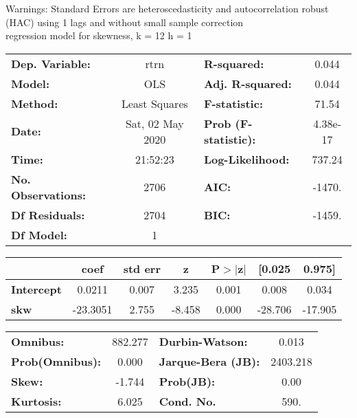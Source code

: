 Warnings: \newline
 [1] Standard Errors are heteroscedasticity and autocorrelation robust (HAC) using 1 lags and without small sample correction\\ 

regression model for skewness, k = 12 h = 1\begin{center}
\begin{tabular}{lclc}
\toprule
\textbf{Dep. Variable:}    &       rtrn       & \textbf{  R-squared:         } &     0.044   \\
\textbf{Model:}            &       OLS        & \textbf{  Adj. R-squared:    } &     0.044   \\
\textbf{Method:}           &  Least Squares   & \textbf{  F-statistic:       } &     71.54   \\
\textbf{Date:}             & Sat, 02 May 2020 & \textbf{  Prob (F-statistic):} &  4.38e-17   \\
\textbf{Time:}             &     21:52:23     & \textbf{  Log-Likelihood:    } &    737.24   \\
\textbf{No. Observations:} &        2706      & \textbf{  AIC:               } &    -1470.   \\
\textbf{Df Residuals:}     &        2704      & \textbf{  BIC:               } &    -1459.   \\
\textbf{Df Model:}         &           1      & \textbf{                     } &             \\
\bottomrule
\end{tabular}
\begin{tabular}{lcccccc}
                   & \textbf{coef} & \textbf{std err} & \textbf{z} & \textbf{P$> |$z$|$} & \textbf{[0.025} & \textbf{0.975]}  \\
\midrule
\textbf{Intercept} &       0.0211  &        0.007     &     3.235  &         0.001        &        0.008    &        0.034     \\
\textbf{skw}       &     -23.3051  &        2.755     &    -8.458  &         0.000        &      -28.706    &      -17.905     \\
\bottomrule
\end{tabular}
\begin{tabular}{lclc}
\textbf{Omnibus:}       & 882.277 & \textbf{  Durbin-Watson:     } &    0.013  \\
\textbf{Prob(Omnibus):} &   0.000 & \textbf{  Jarque-Bera (JB):  } & 2403.218  \\
\textbf{Skew:}          &  -1.744 & \textbf{  Prob(JB):          } &     0.00  \\
\textbf{Kurtosis:}      &   6.025 & \textbf{  Cond. No.          } &     590.  \\
\bottomrule
\end{tabular}
\end{center}

